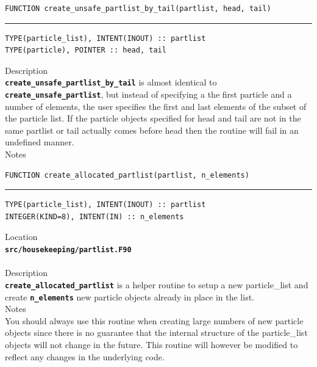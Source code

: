 \documentclass[12pt,a4paper]{article}
\newcommand{\HRule}{\rule{\linewidth}{0.5mm}}
\newcommand{\inlinecode}[1]{{\color{warwickred} \bf\texttt{#1}}}
\newcommand{\codedef}{\begin{Verbatim}[formatcom=\color{warwickred},fontsize=\Large,hfuzz=0pt]}
\newcommand{\coderule}{
{\color{warwickred}\vspace{-0.5cm}\HRule}
\codedef}
\begin{document}
\pagebreak
\codedef
FUNCTION create_unsafe_partlist_by_tail(partlist, head, tail)
\end{Verbatim}
\coderule
TYPE(particle_list), INTENT(INOUT) :: partlist
TYPE(particle), POINTER :: head, tail
\end{Verbatim}
\vspace{1cm}
{\Large Description\\}
\inlinecode{create\_unsafe\_partlist\_by\_tail} is almost identical to
\inlinecode{create\_unsafe\_partlist}, but instead of specifying a the first
particle and a number of elements, the user specifies the first and last
elements of the subset of the particle list. If the particle objects specified
for head and tail are not in the same partlist or tail actually comes before
head then the routine will fail in an undefined manner.
\\[0.5cm]
{\Large Notes\\}

\pagebreak
\codedef
FUNCTION create_allocated_partlist(partlist, n_elements)
\end{Verbatim}
\coderule
TYPE(particle_list), INTENT(INOUT) :: partlist
INTEGER(KIND=8), INTENT(IN) :: n_elements
\end{Verbatim}
\vspace{1cm}
{\Large Location\\}
\inlinecode{src/housekeeping/partlist.F90}\\
\\[0.5cm]
{\Large Description\\}
\inlinecode{create\_allocated\_partlist} is a helper routine to setup a new
particle\_list and create \inlinecode{n\_elements} new particle objects already
in place in the list.
\\[0.5cm]
{\Large Notes\\}
You should always use this routine when creating large numbers of new particle
objects since there is no guarantee that the internal structure of the
particle\_list objects will not change in the future. This routine will however
be modified to reflect any changes in the underlying code.
\end{document}
